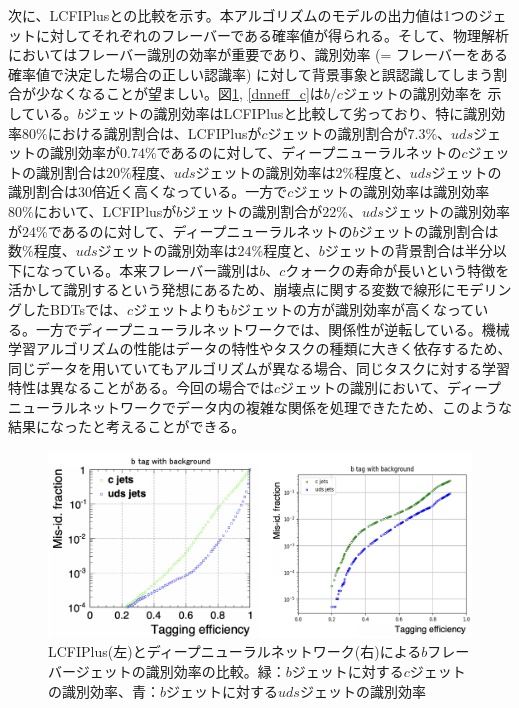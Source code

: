 次に、LCFIPlusとの比較を示す。本アルゴリズムのモデルの出力値は1つのジェットに対してそれぞれのフレーバーである確率値が得られる。そして、物理解析においてはフレーバー識別の効率が重要であり、識別効率 (= フレーバーをある確率値で決定した場合の正しい認識率) に対して背景事象と誤認識してしまう割合が少なくなることが望ましい。図\ref{dnneff_b}, \ref{dnneff_c}は$b/c$ジェットの識別効率を
示している。$b$ジェットの識別効率はLCFIPlusと比較して劣っており、特に識別効率$80\%$における識別割合は、LCFIPlusが$c$ジェットの識別割合が$7.3\%$、$uds$ジェットの識別効率が$0.74\%$であるのに対して、ディープニューラルネットの$c$ジェットの識別割合は$20\%程度$、$uds$ジェットの識別効率は$2\%程度$と、$uds$ジェットの識別割合は30倍近く高くなっている。一方で$c$ジェットの識別効率は識別効率$80\%$において、LCFIPlusが$b$ジェットの識別割合が$22\%$、$uds$ジェットの識別効率が$24\%$であるのに対して、ディープニューラルネットの$b$ジェットの識別割合は$数\%程度$、$uds$ジェットの識別効率は$24\%程度$と、$b$ジェットの背景割合は半分以下になっている。本来フレーバー識別は$b$、$c$クォークの寿命が長いという特徴を活かして識別するという発想にあるため、崩壊点に関する変数で線形にモデリングしたBDTsでは、$c$ジェットよりも$b$ジェットの方が識別効率が高くなっている。一方でディープニューラルネットワークでは、関係性が逆転している。機械学習アルゴリズムの性能はデータの特性やタスクの種類に大きく依存するため、同じデータを用いていてもアルゴリズムが異なる場合、同じタスクに対する学習特性は異なることがある。今回の場合では$c$ジェットの識別において、ディープニューラルネットワークでデータ内の複雑な関係を処理できたため、このような結果になったと考えることができる。
\begin{figure}[H]
	\begin{center}
 \includegraphics[keepaspectratio, scale=0.3]
 	{Figure/Flavortagging/dnneff_b.png}
 		\caption{LCFIPlus(左)とディープニューラルネットワーク(右)による$b$フレーバージェットの識別効率の比較。緑：$b$ジェットに対する$c$ジェットの識別効率、青：$b$ジェットに対する$uds$ジェットの識別効率}
 		\label{dnneff_b}
	\end{center}
\end{figure}

